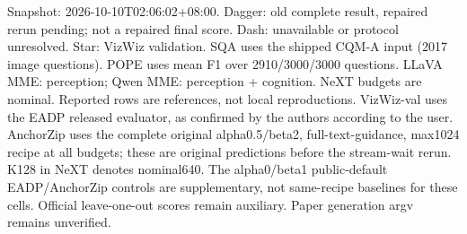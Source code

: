 \documentclass[10pt,a4paper]{article}
\begin{document}
{\footnotesize Snapshot: 2026-10-10T02:06:02+08:00. Dagger: old complete result, repaired rerun pending; not a repaired final score. Dash: unavailable or protocol unresolved. Star: VizWiz validation. SQA uses the shipped CQM-A input (2017 image questions). POPE uses mean F1 over 2910/3000/3000 questions. LLaVA MME: perception; Qwen MME: perception + cognition. NeXT budgets are nominal. Reported rows are references, not local reproductions. VizWiz-val uses the EADP released evaluator, as confirmed by the authors according to the user. AnchorZip uses the complete original alpha0.5/beta2, full-text-guidance, max1024 recipe at all budgets; these are original predictions before the stream-wait rerun. K128 in NeXT denotes nominal640. The alpha0/beta1 public-default EADP/AnchorZip controls are supplementary, not same-recipe baselines for these cells. Official leave-one-out scores remain auxiliary. Paper generation argv remains unverified.\par}
\end{document}

